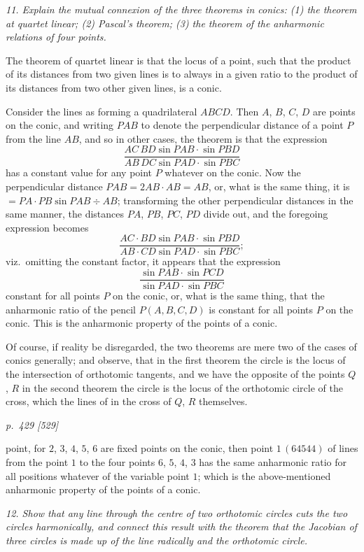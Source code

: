 \documentclass[11pt,a4paper]{book}
\begin{document}
\textit{11. Explain the mutual connexion of the three theorems in conics: (1) the theorem at quartet linear; (2) Pascal's theorem; (3) the theorem of the anharmonic relations of four points.}

The theorem of quartet linear is that the locus of a point, such that the product
of its distances from two given lines is to always in a given ratio to the product of
its distances from two other given lines, is a conic.

Consider the lines as forming a quadrilateral $ABCD$. Then $A$, $B$, $C$, $D$ are points
on the conic, and writing $PAB$ to denote the perpendicular distance of a point $P$
from the line $AB$, and so in other cases, the theorem is that the expression
\[
\frac{AC\,BD\sin PAB \cdot \sin PBD}{AB\,DC\sin PAD\cdot\sin PBC}
\]
has a constant value for any point $P$ whatever on the conic. Now the perpendicular
distance $PAB = 2AB \cdot AB = AB$, or, what is the same thing, it is $= PA \cdot PB \sin PAB \div AB$;
transforming the other perpendicular distances in the same manner, the distances $PA$,
$PB$, $PC$, $PD$ divide out, and the foregoing expression becomes
\[
\frac{AC \cdot BD \sin PAB \cdot \sin PBD}{AB \cdot CD \sin PAD \cdot \sin PBC};
\]
viz.\ omitting the constant factor, it appears that the expression
\[
\frac{\sin PAB \cdot \sin PCD}{\sin PAD \cdot \sin PBC}
\]
constant for all points $P$ on the conic, or, what is the same thing, that the anharmonic
ratio of the pencil $P(A, B, C, D)$ is constant for all points $P$ on the conic. This is
the anharmonic property of the points of a conic.

Of course, if reality be disregarded, the two theorems are mere two of the cases of conics generally; and observe, that in the first theorem the circle is the locus of the intersection of orthotomic tangents, and we have the opposite of the points $Q$, $R$ in the second theorem the circle is the locus of the orthotomic circle of the cross, which the lines of in the cross of $Q$, $R$ themselves.

\clearpage

\bigskip
\textit{p.~429 [529]}
\smallskip

\noindent
point, for $2$, $3$, $4$, $5$, $6$ are fixed points on the conic, then point $1\,(64544)$ of lines from
the point $1$ to the four points $6$, $5$, $4$, $3$ has the same anharmonic ratio for all
positions whatever of the variable point $1$; which is the above-mentioned anharmonic
property of the points of a conic.

\textit{12. Show that any line through the centre of two orthotomic circles cuts the two circles harmonically, and connect this result with the theorem that the Jacobian of three circles is made up of the line radically and the orthotomic circle.}
\end{document}
